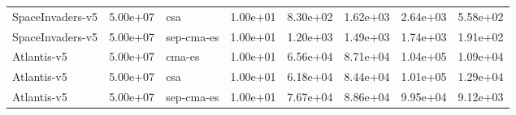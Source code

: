 \begin{longtable}{lrlrrrrr}
SpaceInvaders-v5 & 5.00e+07 & csa & 1.00e+01 & 8.30e+02 & 1.62e+03 & 2.64e+03 & 5.58e+02 \\
SpaceInvaders-v5 & 5.00e+07 & sep-cma-es & 1.00e+01 & 1.20e+03 & 1.49e+03 & 1.74e+03 & 1.91e+02 \\
Atlantis-v5 & 5.00e+07 & cma-es & 1.00e+01 & 6.56e+04 & 8.71e+04 & 1.04e+05 & 1.09e+04 \\
Atlantis-v5 & 5.00e+07 & csa & 1.00e+01 & 6.18e+04 & 8.44e+04 & 1.01e+05 & 1.29e+04 \\
Atlantis-v5 & 5.00e+07 & sep-cma-es & 1.00e+01 & 7.67e+04 & 8.86e+04 & 9.95e+04 & 9.12e+03 \\
\end{longtable}
